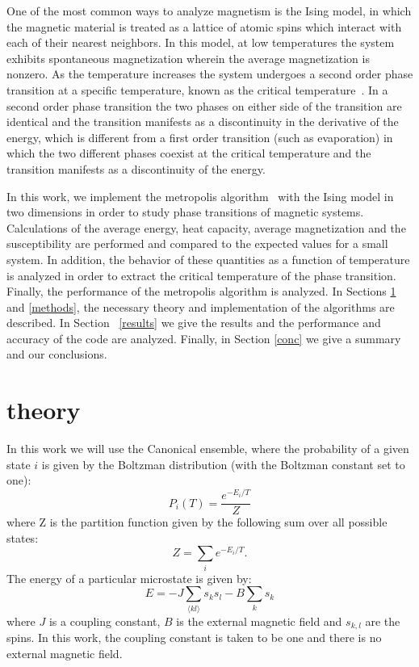 \documentclass[prc,amsmath,twocolumn,superscriptaddress]{revtex4}
\begin{document}
One of the most common ways to analyze magnetism is the Ising model, in which the magnetic material is treated as a lattice of atomic spins which interact with each of their nearest neighbors. In this model, at low temperatures the system exhibits spontaneous magnetization wherein the average magnetization is nonzero. As the temperature increases the system undergoes a second order phase transition at a specific temperature, known as the critical temperature~\cite{ising}. In a second order phase transition the two phases on either side of the transition are identical and the transition manifests as a discontinuity in the derivative of the energy, which is different from a first order transition (such as evaporation) in which the two different phases coexist at the critical temperature and the transition manifests as a discontinuity of the energy.

In this work, we implement the metropolis algorithm~\cite{met} with the Ising model in two dimensions in order to study phase transitions of magnetic systems. Calculations of the average energy, heat capacity, average magnetization and the susceptibility are performed and compared to the expected values for a small system. In addition, the behavior of these quantities as a function of temperature is analyzed in order to extract the critical temperature of the phase transition. Finally, the performance of the metropolis algorithm is analyzed. In Sections \ref{theory} and \ref{methods}, the necessary theory and implementation of the algorithms are described. In Section ~\ref{results} we give the results and the performance and accuracy of the code are analyzed. Finally, in Section \ref{conc} we give a summary and our conclusions.

\section{theory}
\label{theory}
In this work we will use the Canonical ensemble, where the probability of a given state $i$ is given by the Boltzman distribution (with the Boltzman constant set to one):
\begin{equation}
P_i(T) = \frac{e^{-E_i/T}}{Z}
\end{equation}
where Z is the partition function given by the following sum over all possible states:
\begin{equation}
Z=\sum_i e^{-E_i/T}.
\end{equation}
The energy of a particular microstate is given by:
\begin{equation}
E= -J\sum_{\langle kl \rangle} s_ks_l-B\sum_k s_k
\end{equation}
where $J$ is a coupling constant, $B$ is the external magnetic field and $s_{k,l}$ are the spins. In this work, the coupling constant is taken to be one and there is no external magnetic field.
\end{document}
